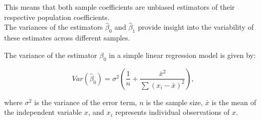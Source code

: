 This means that both sample coefficients are unbiased estimators of their respective population coefficients. \\

The variances of the estimators \(\hat{\beta}_0\) and \(\hat{\beta}_1\) provide insight into the variability of these estimates across different samples. 

\begin{theorem}
    The variance of the estimator \(\hat{\beta}_0\) in a simple linear regression model is given by:

\[
Var(\hat{\beta}_0) = \sigma^2 \left( \frac{1}{n} + \frac{\bar{x}^2}{\sum (x_i - \bar{x})^2} \right),
\]

where \(\sigma^2\) is the variance of the error term, \(n\) is the sample size, \(\bar{x}\) is the mean of the independent variable \(x\), and \(x_i\) represents individual observations of \(x\).
\end{theorem}

